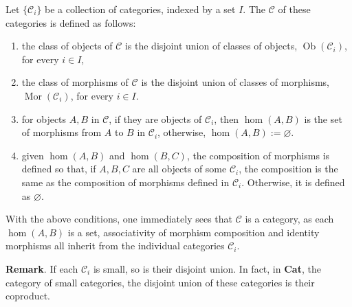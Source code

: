 \documentclass[12pt]{article}
\begin{document}
Let $\lbrace \mathcal{C}_i\rbrace$ be a collection of categories, indexed by a set $I$.  The  $\mathcal{C}$ of these categories is defined as follows:
\begin{enumerate}
\item the class of objects of $\mathcal{C}$ is the disjoint union of classes of objects, $\operatorname{Ob}(\mathcal{C}_i)$, for every $i\in I$,
\item the class of morphisms of $\mathcal{C}$ is the disjoint union of classes of morphisms, $\operatorname{Mor}(\mathcal{C}_i)$, for every $i\in I$.
\item for objects $A,B$ in $\mathcal{C}$, if they are objects of $\mathcal{C}_i$, then $\hom(A,B)$ is the set of morphisms from $A$ to $B$ in $\mathcal{C}_i$, otherwise, $\hom(A,B):=\varnothing$.
\item given $\hom(A,B)$ and $\hom(B,C)$, the composition of morphisms is defined so that, if $A,B,C$ are all objects of some $\mathcal{C}_i$, the composition is the same as the composition of morphisms defined in $\mathcal{C}_i$.  Otherwise, it is defined as $\varnothing$.
\end{enumerate}

With the above conditions, one immediately sees that $\mathcal{C}$ is a category, as each $\hom(A,B)$ is a set, associativity of morphism composition and identity morphisms all inherit from the individual categories $\mathcal{C}_i$.

\textbf{Remark}.  If each $\mathcal{C}_i$ is small, so is their disjoint union.  In fact, in \textbf{Cat}, the category of small categories, the disjoint union of these categories is their coproduct.
\end{document}

